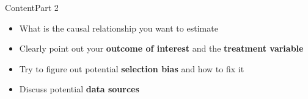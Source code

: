 \documentclass[dvipsnames,hyperref={pdfpagelabels=false}]{beamer}
\begin{document}
\begin{frame}{Content}{Part 2}
	\begin{itemize} 
		
		\item What is the causal relationship you want to estimate
		\vspace{0.2cm}
		\item Clearly point out your \textbf{outcome of interest} and the \textbf{treatment variable}
		\vspace{0.2cm}
		\item Try to figure out potential \textbf{selection bias} and how to fix it
		\vspace{0.2cm}
		\item Discuss potential \textbf{data sources}
		
		
		
	\end{itemize}
\end{frame}
\end{document}
